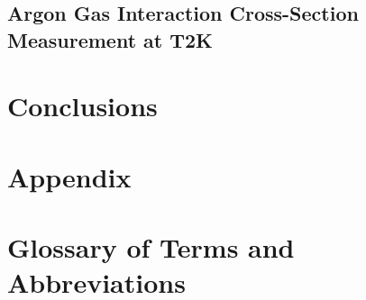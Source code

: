 \documentclass[a4paper, 11pt]{report}
\begin{document}
\section{Argon Gas Interaction Cross-Section Measurement at T2K}



\chapter{Conclusions}


\chapter*{Appendix}


\chapter*{Glossary of Terms and Abbreviations}




\end{document}
